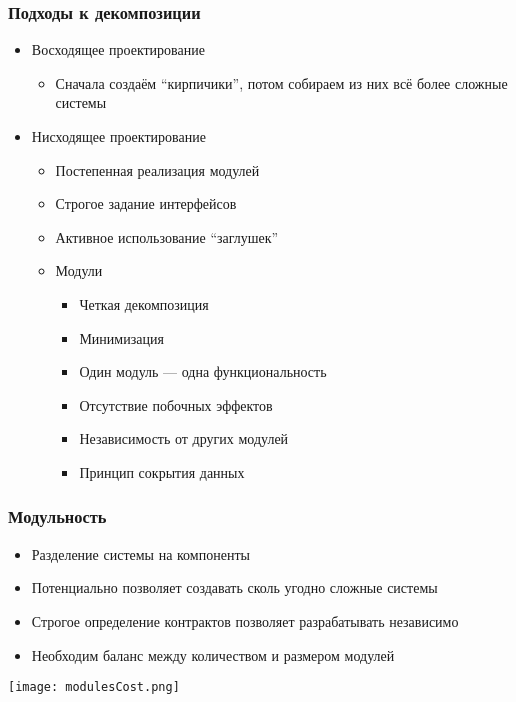\documentclass{../../slides-style}
\begin{document}
    \begin{frame}
        \frametitle{Подходы к декомпозиции}
        \begin{itemize}
            \item Восходящее проектирование
            \begin{itemize}
                \item Сначала создаём ``кирпичики'', потом собираем из них всё более сложные системы
            \end{itemize}
            \item Нисходящее проектирование
            \begin{itemize}
                \item Постепенная реализация модулей
                \item Строгое задание интерфейсов
                \item Активное использование ``заглушек''
                \item Модули
                \begin{itemize}
                    \item Четкая декомпозиция
                    \item Минимизация
                    \item Один модуль --- одна функциональность
                    \item Отсутствие побочных эффектов
                    \item Независимость от других модулей
                    \item Принцип сокрытия данных
                \end{itemize}
            \end{itemize}
        \end{itemize}
    \end{frame}
    
    \begin{frame}
        \frametitle{Модульность}
        \begin{itemize}
            \item Разделение системы на компоненты
            \item Потенциально позволяет создавать сколь угодно сложные системы
            \item Строгое определение контрактов позволяет разрабатывать независимо
            \item Необходим баланс между количеством и размером модулей
        \end{itemize}
        \vskip 1cm
        \begin{center}
            \texttt{[image: modulesCost.png]}
        \end{center}
    \end{frame}
\end{document}
